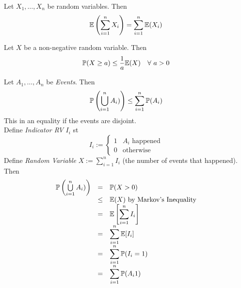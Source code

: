 \documentclass[11pt,a4paper]{article}
\begin{document}
Let $X_1,\dots,X_n$ be random variables. Then
$$\mathbb{E}\left(\sum_{i=1}^nX_i\right)=\sum_{i=1}^n\mathbb{E}(X_i)$$

Let $X$ be a non-negative random variable. Then
$$\prob(X\geq a)\leq\frac1a\expect(X)\quad\forall\ a>0$$

Let $A_1,\dots,A_n$ be \textit{Events}. Then
$$\mathbb{P}\left(\bigcup\limits_{i=1}^nA_i)\right)\leq\sum_{i=1}^n\mathbb{P}(A_i)$$
\nb This in an equality if the events are disjoint.\\

Define \textit{Indicator RV} $I_i$ st
$$I_i:=\begin{cases}1&A_i\text{ happened}\\0&\text{otherwise}\end{cases}$$
Define \textit{Random Variable} $X:=\sum_{i=1}^nI_i$ (the number of events that happened).\\
Then
\[\begin{array}{rcl}
\mathbb{P}\left(\bigcup\limits_{i=1}^nA_i)\right)&=&\mathbb{P}(X>0)\\
&\leq&\mathbb{E}(X)\text{ by Markov's Inequality}\\
&=&\mathbb{E}\left[\displaystyle\sum_{i=1}^nI_i\right]\\
&=&\displaystyle\sum_{i=1}^n\mathbb{E}[I_i]\\
&=&\displaystyle\sum_{i=1}^n\mathbb{P}(I_i=1)\\
&=&\displaystyle\sum_{i=1}^n\mathbb{P}(A_i1)
\end{array}\]
\proved
\end{document}
